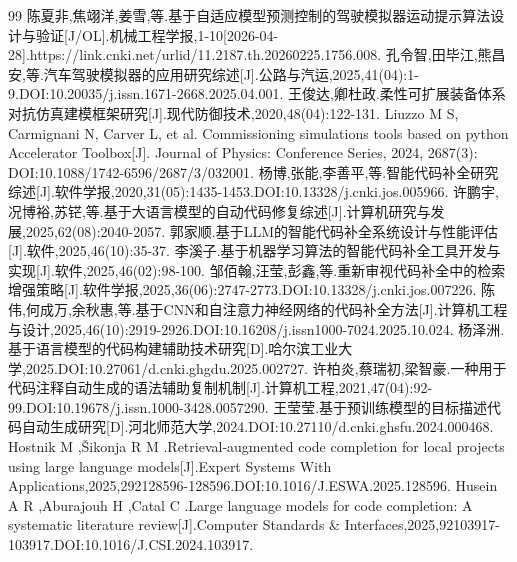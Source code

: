 
\clearpage
{}
{}
\begingroup
\songti
{}
\setlength{\parskip}{0pt}
\linespread{1.0}\selectfont
\sloppy

\begin{thebibliography}{99}
	\vspace{-1.5em}
	\setlength{\itemsep}{0pt}
	\setlength{\parsep}{0pt}
	\setlength{\parskip}{0pt}
 陈夏非,焦翊洋,姜雪,等.基于自适应模型预测控制的驾驶模拟器运动提示算法设计与验证[J/OL].机械工程学报,1-10[2026-04-28].https://link.cnki.net/urlid/11.2187.th.20260225.1756.008.
 孔令智,田毕江,熊昌安,等.汽车驾驶模拟器的应用研究综述[J].公路与汽运,2025,41(04):1-9.DOI:10.20035/j.issn.1671-2668.2025.04.001.
 王俊达,卿杜政.柔性可扩展装备体系对抗仿真建模框架研究[J].现代防御技术,2020,48(04):122-131.
Liuzzo M S, Carmignani N, Carver L, et al. Commissioning simulations tools based on python Accelerator Toolbox[J]. Journal of Physics: Conference Series, 2024, 2687(3): DOI:10.1088/1742-6596/2687/3/032001.
 杨博,张能,李善平,等.智能代码补全研究综述[J].软件学报,2020,31(05):1435-1453.DOI:10.13328/j.cnki.jos.005966.
 许鹏宇,况博裕,苏铓,等.基于大语言模型的自动代码修复综述[J].计算机研究与发展,2025,62(08):2040-2057.
 郭家顺.基于LLM的智能代码补全系统设计与性能评估[J].软件,2025,46(10):35-37.
 李溪子.基于机器学习算法的智能代码补全工具开发与实现[J].软件,2025,46(02):98-100.
 邹佰翰,汪莹,彭鑫,等.重新审视代码补全中的检索增强策略[J].软件学报,2025,36(06):2747-2773.DOI:10.13328/j.cnki.jos.007226.
 陈伟,何成万,余秋惠,等.基于CNN和自注意力神经网络的代码补全方法[J].计算机工程与设计,2025,46(10):2919-2926.DOI:10.16208/j.issn1000-7024.2025.10.024.
 杨泽洲.基于语言模型的代码构建辅助技术研究[D].哈尔滨工业大学,2025.DOI:10.27061/d.cnki.ghgdu.2025.002727.
 许柏炎,蔡瑞初,梁智豪.一种用于代码注释自动生成的语法辅助复制机制[J].计算机工程,2021,47(04):92-99.DOI:10.19678/j.issn.1000-3428.0057290.
 王莹莹.基于预训练模型的目标描述代码自动生成研究[D].河北师范大学,2024.DOI:10.27110/d.cnki.ghsfu.2024.000468.
 Hostnik M ,Šikonja R M .Retrieval-augmented code completion for local projects using large language models[J].Expert Systems With Applications,2025,292128596-128596.DOI:10.1016/J.ESWA.2025.128596.
 Husein A R ,Aburajouh H ,Catal C .Large language models for code completion: A systematic literature review[J].Computer Standards \& Interfaces,2025,92103917-103917.DOI:10.1016/J.CSI.2024.103917.

\end{thebibliography}

